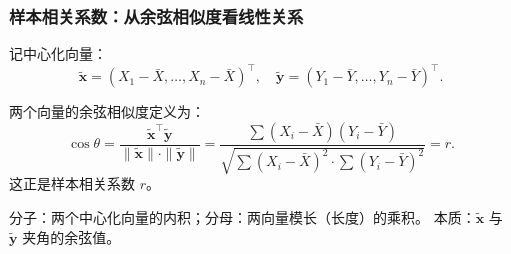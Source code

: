 \documentclass[11pt]{beamer}
\begin{document}
\begin{frame}
    \frametitle{样本相关系数：从余弦相似度看线性关系}
    \small
    记中心化向量：
    \[
        \tilde{\mathbf{x}} = (X_1-\bar{X},\ldots,X_n-\bar{X})^\top,\quad
        \tilde{\mathbf{y}} = (Y_1-\bar{Y},\ldots,Y_n-\bar{Y})^\top.
    \]

    两个向量的余弦相似度定义为：
    \[
        \cos\theta = \frac{\tilde{\mathbf{x}}^\top\tilde{\mathbf{y}}}{\|\tilde{\mathbf{x}}\|\cdot\|\tilde{\mathbf{y}}\|}
        = \frac{\sum (X_i-\bar{X})(Y_i-\bar{Y})}{\sqrt{\sum (X_i-\bar{X})^2 \cdot \sum (Y_i-\bar{Y})^2}} = r.
    \]
    这正是样本相关系数 $r$。

    分子：两个中心化向量的内积；分母：两向量模长（长度）的乘积。
    本质：$\tilde{\mathbf{x}}$ 与 $\tilde{\mathbf{y}}$ 夹角的余弦值。
\end{frame}
\end{document}
